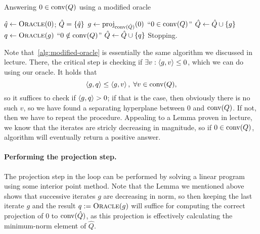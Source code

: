 \documentclass[10pt]{article}
\begin{document}
\begin{Answer}
	\begin{algorithm}[H]
		\caption{Answering $0 \in \mathrm{conv}(Q)$ using a modified oracle}
		\begin{algorithmic}
			\State $\hat{q} \gets \textsc{Oracle}(0)$; $\hat{Q} =
			\left\{ \hat{q} \right\}$ 
			\Repeat
				\State $g \gets \mathrm{proj}_{\mathrm{conv}(\hat{Q})}(0)$
					\State \Return ``$0 \in \mathrm{conv}(Q)$''
				\Else
					\State $\hat{Q} \gets \hat{Q} \cup \left\{ g \right\}$
				\EndIf
				\State $q \gets \textsc{Oracle}(g)$
					\State \Return ``$0 \notin \mathrm{conv}(Q)$''
				\EndIf
				\State $\hat{Q} \gets \hat{Q} \cup \left\{ q \right\}$
			\Until Stopping.
		\end{algorithmic}
		\label{alg:modified-oracle}
	\end{algorithm}
	Note that~\cref{alg:modified-oracle} is essentially the same algorithm we
	discussed in lecture. There, the critical step is checking if $\exists v:
	\left\langle g, v \right\rangle \leq 0$, which we can do using our oracle. It holds that
	\[
		\left\langle g, q \right\rangle \leq \left\langle g, v \right\rangle, \; \forall v \in \mathrm{conv}(Q),
	\]
	so it suffices to check if $\left\langle g, q \right\rangle > 0$; if that is the case, then
	obviously there is no such $v$, so we have found a separating hyperplane
	between $0$ and $\mathrm{conv}(Q)$. If not, then we have to repeat the
	procedure. Appealing to a Lemma proven in lecture, we know that the
	iterates are stricly decreasing in magnitude, so if $0 \in \mathrm{conv}(Q)$,
	algorithm will eventually return a positive answer.

	\paragraph{Performing the projection step.} The projection
	step in the loop can be performed by solving a linear program using some
	interior point method. Note that the Lemma we mentioned above shows that
	successive iterates $g$ are decreasing in norm, so then keeping the last
	iterate $g$ and the result $q := \textsc{Oracle}(g)$ will suffice for
	computing the correct projection of $0$ to $\mathrm{conv}(\hat{Q})$, as this
	projection is effectively calculating the minimum-norm element of
	$\hat{Q}$.



\end{Answer}
\end{document}

